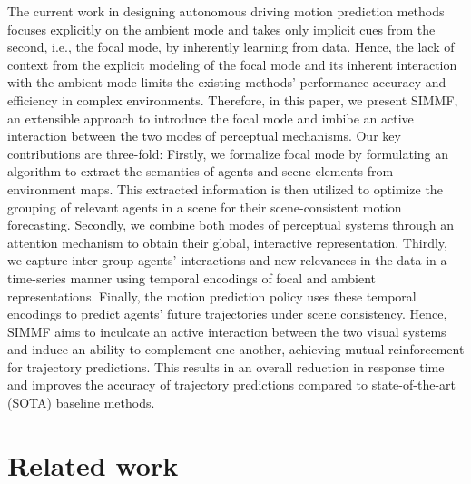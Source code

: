 \documentclass[letterpaper, 10 pt, conference]{ieeeconf}  %
\begin{document}
The current work in designing autonomous driving motion prediction methods focuses explicitly on the ambient mode and takes only implicit cues from the second, i.e., the focal mode, by inherently learning from data. Hence, the lack of context from the explicit modeling of the focal mode and its inherent interaction with the ambient mode limits the existing methods' performance accuracy and efficiency in complex environments. Therefore, in this paper, we present SIMMF, an extensible approach to introduce the focal mode and imbibe an active interaction between the two modes of perceptual mechanisms. Our key contributions are three-fold: Firstly, we formalize focal mode by formulating an algorithm to extract the semantics of agents and scene elements from environment maps. This extracted information is then utilized to optimize the grouping of relevant agents in a scene for their scene-consistent motion forecasting. Secondly, we combine both modes of perceptual systems through an attention mechanism to obtain their global, interactive representation. Thirdly,  we capture inter-group agents' interactions and new relevances in the data in a time-series manner using temporal encodings of focal and ambient representations. Finally, the motion prediction policy uses these temporal encodings to predict agents' future trajectories under scene consistency. Hence, SIMMF aims to inculcate an active interaction between the two visual systems and induce an ability to complement one another, achieving mutual reinforcement for trajectory predictions. This results in an overall reduction in response time and improves the accuracy of trajectory predictions compared to state-of-the-art (SOTA) baseline methods. 

\section{Related work}
\end{document}
